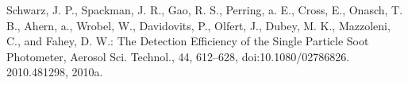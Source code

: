 \documentclass[11pt]{article}
\begin{document}
Schwarz, J. P., Spackman, J. R., Gao, R. S., Perring, a. E., Cross, E., Onasch, T. B., Ahern, a., Wrobel, W., Davidovits, P., Olfert, J., Dubey, M. K., Mazzoleni, C., and Fahey, D. W.: The Detection Efficiency of the Single Particle Soot Photometer, Aerosol Sci. Technol., 44, 612–628, doi:10.1080/02786826. 2010.481298, 2010a.









\end{document}
